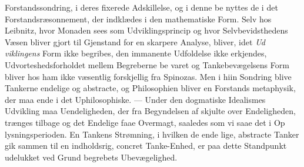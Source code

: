 \documentclass[12pt,a4paper]{book}
\begin{document}
Forstandssondring, i deres fixerede Adskillelse, og i denne be\-%
nyttes de i det Forstandsræsonnement, der indklædes i den
mathematiske Form. Selv hos Leibnitz, hvor Monaden sees
som Udviklingsprincip og hvor Selvbevidsthedens Væsen bliver
gjort til Gjenstand for en skarpere Analyse, bliver, idet \emph{Ud\-%
viklingens} Form ikke begribes, den immanente Udfoldelse
ikke erkjendes, Udvorteshedsforholdet mellem Begreberne be\-%
varet og Tankebevægelsens Form bliver hos ham ikke væsentlig
forskjellig fra Spinozas. Men i hiin Sondring blive Tankerne
endelige og abstracte, og Philosophien bliver en Forstands\-%
metaphysik, der maa ende i det Uphilosophiske. --- Under den
dogmatiske Idealismes Udvikling maa Uendeligheden, der fra
Begyndelsen af skjulte over Endeligheden, trænges tilbage og
det Endelige faae Overmagt, saaledes som vi saae det i Op\-%
lysningsperioden. En Tankens Strømning, i hvilken de ende\-%
lige, abstracte Tanker gik sammen til en indholdsrig, concret
Tanke-Enhed, er paa dette Standpunkt udelukket ved Grund\-%
begrebets Ubevægelighed.
\end{document}
